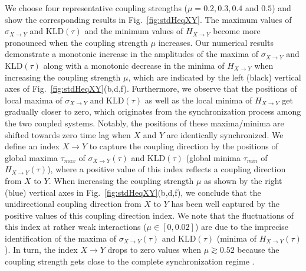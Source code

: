 \documentclass[12pt,aip,cha,reprint,nofootinbib]{revtex4-1}
\begin{document}
We choose four representative coupling strengths ($\mu = 0.2, 0.3, 0.4$ and $0.5$) and show the corresponding results in Fig.~\ref{fig:stdHeqXY}. The maximum values of $\sigma_{X \to Y}$ and $\text{KLD}(\tau)$ and the minimum values of $H_{X \to Y}$ become more pronounced when the coupling strength $\mu$ increases. Our numerical results demonstrate a monotonic increase in the amplitudes of the maxima of $\sigma_{X \to Y}$ and $\text{KLD}(\tau)$ along with a monotonic decrease in the minima of $H_{X\to Y}$ when increasing the coupling strength $\mu$, which are indicated by the left (black) vertical axes of Fig.~\ref{fig:stdHeqXY}(b,d,f). Furthermore, we observe that the positions of local maxima of $\sigma_{X \to Y}$ and $\text{KLD}(\tau)$ as well as the local minima of $H_{X\to Y}$ get gradually closer to zero, which originates from the synchronization process among the two coupled systems. Notably, the positions of these maxima/minima are shifted towards zero time lag when $X$ and $Y$ are identically synchronized. We define an index $X \to Y$ to capture the coupling direction by the positions of global maxima $\tau_{max}$ of $\sigma_{X \to Y}(\tau)$ and $\text{KLD}(\tau)$ (global minima $\tau_{min}$ of $H_{X \to Y}(\tau)$), where a positive value of this index reflects a coupling direction from $X$ to $Y$. When increasing the coupling strength $\mu$ as shown by the right (blue) vertical axes in Fig.~\ref{fig:stdHeqXY}(b,d,f), we conclude that the unidirectional coupling direction from $X$ to $Y$ has been well captured by the positive values of this coupling direction index. We note that the fluctuations of this index at rather weak interactions ($\mu \in [0, 0.02]$) are due to the imprecise identification of the maxima of $\sigma_{X\to Y}(\tau)$ and $\text{KLD}(\tau)$ (minima of $H_{X\to Y}(\tau)$). In turn, the index $X \to Y$ drops to zero values when $\mu \gtrsim 0.52$ because the coupling strength gets close to the complete synchronization regime \cite{RomanoPRE2007}. 
\end{document}
